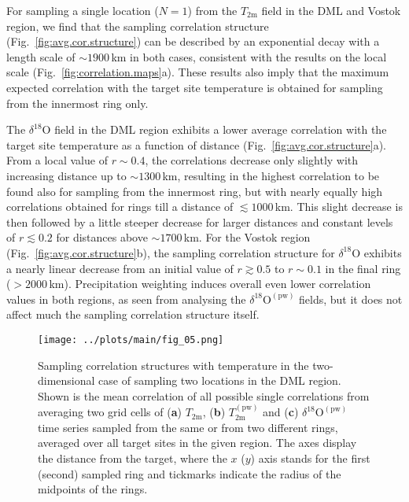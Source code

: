 \documentclass[cp, manuscript]{copernicus}
\begin{document}
For sampling a single location ($N=1$) from the $T_{\mathrm{2m}}$ field in the
DML and Vostok region, we find that the sampling correlation structure
(Fig.~\ref{fig:avg.cor.structure}) can be described by an exponential decay with
a length scale of $\sim1900$\,km in both cases, consistent with the results on
the local scale (Fig.~\ref{fig:correlation.maps}a). These results also imply
that the maximum expected correlation with the target site temperature
is obtained for sampling from the innermost ring only.

The $\delta^{18}\mathrm{O}$ field in the DML region exhibits a lower average
correlation with the target site temperature as a function of distance
(Fig.~\ref{fig:avg.cor.structure}a). From a local value of $r\sim0.4$, the
correlations decrease only slightly with increasing distance up to
$\sim1300$\,km, resulting in the highest correlation to be found also for
sampling from the innermost ring, but with nearly equally high correlations
obtained for rings till a distance of $\lesssim1000$\,km. This slight decrease
is then followed by a little steeper decrease for larger distances and constant
levels of $r\lesssim0.2$ for distances above $\sim1700$\,km. For the Vostok
region (Fig.~\ref{fig:avg.cor.structure}b), the sampling correlation structure
for $\delta^{18}\mathrm{O}$ exhibits a nearly linear decrease from an initial
value of $r\gtrsim0.5$ to $r\sim0.1$ in the final ring ($>2000$\,km).
Precipitation weighting induces overall even lower correlation values in both
regions, as seen from analysing the $\delta^{18}\mathrm{O}^{\mathrm{(pw)}}$
fields, but it does not affect much the sampling correlation structure itself.

\begin{figure*}[t]%
\centering
\texttt{[image: ../plots/main/fig\_05.png]}
\caption{%
  Sampling correlation structures with temperature in the two-dimensional case
  of sampling two locations in the DML region. Shown is the mean correlation of
  all possible single correlations from averaging two grid cells of (\textbf{a})
  $T_{\mathrm{2m}}$, (\textbf{b}) $T_{\mathrm{2m}}^{\mathrm{(pw)}}$ and
  (\textbf{c}) $\delta^{18}\mathrm{O}^{\mathrm{(pw)}}$ time series sampled from
  the same or from two different rings, averaged over all target sites in the
  given region. The axes display the distance from the target, where the $x$
  ($y$) axis stands for the first (second) sampled ring and tickmarks indicate
  the radius of the midpoints of the rings.}
\label{fig:two-core-correlation}%
\end{figure*}%
\end{document}

